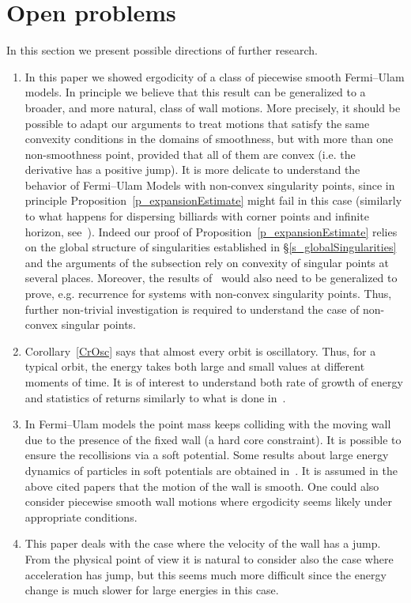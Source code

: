 \documentclass[10pt]{amsart}
\theoremstyle{definition}\newtheorem{defi}[theo]{Definition}\newtheorem{rema}[theo]{Remark}\newtheorem{exam}[theo]{Example}\newtheorem{exem}[theo]{Example}\newtheorem{nota}[theo]{Notation}
\newcommand*{\relabel}{\renewcommand{\labelenumi}{(\theenumi)}}
\newcommand*{\Romanenumi}{\renewcommand*{\theenumi}{\Roman{enumi}}\relabel}
\begin{document}
\section{Open problems}\label{s_conclusions}
In this section we present possible directions of further research.
\begin{enumerate}\Romanenumi
\item In this paper we showed ergodicity of a class of piecewise smooth Fermi--Ulam models. In principle we believe that this result can be generalized to a broader, and more natural, class of wall motions. More precisely, it should be possible to adapt our arguments to treat motions that satisfy the same convexity conditions in the domains of smoothness, but with more than one non-smoothness point, provided that all of them are convex (i.e. the derivative has a positive jump). It is more delicate to understand the behavior of Fermi--Ulam Models with non-convex singularity points, since in principle Proposition~\ref{p_expansionEstimate} might fail in this case (similarly to what happens for dispersing billiards with corner points and infinite horizon, see~\cite{BrownNandori}). Indeed our proof of Proposition~\ref{p_expansionEstimate} relies on the global structure of singularities established in \S \ref{s_globalSingularities} and the arguments of the subsection rely on convexity of singular points at several places. Moreover, the results of~\cite{fum} would also need to be generalized to prove, e.g. recurrence for systems with non-convex singularity points. Thus, further non-trivial investigation is required to understand the case of non-convex singular points.

\item Corollary~\ref{CrOsc} says that almost every orbit is oscillatory. Thus, for a typical orbit, the energy takes both large and small values at different moments of time. It is of interest to understand both rate of growth of energy and statistics of returns similarly to what is done in~\cite{CD2, DSV}.

\item In Fermi--Ulam models the point mass keeps colliding with the moving wall due to the presence of the fixed wall (a hard core constraint). It is possible to ensure the recollisions via a soft potential. Some results about large energy dynamics of particles in soft potentials are obtained in~\cite{D1, P3,dS}. It is assumed in the above cited papers that the motion of the wall is smooth. One could also consider piecewise smooth wall motions where ergodicity seems likely under appropriate conditions.

\item This paper deals with the case where the velocity of the wall has a jump. From the physical point of view it is natural to consider also the case where acceleration has jump, but this seems much more difficult since the energy change is much slower for large energies in this case.
\end{enumerate}
\end{document}
